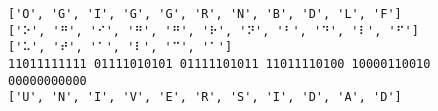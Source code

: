 \documentclass[11pt]{article}
\makeatletter
\newcommand{\boxspacing}{\kern\kvtcb@left@rule\kern\kvtcb@boxsep}
\newcommand{\prompt}[4]{
        \ttfamily\llap{{\color{#2}[#3]:\hspace{3pt}#4}}\vspace{-\baselineskip}
    }
\makeatother
\begin{document}
    \begin{Verbatim}[commandchars=\\\{\}]
['O', 'G', 'I', 'G', 'G', 'R', 'N', 'B', 'D', 'L', 'F']
['⠕', '⠛', '⠊', '⠛', '⠛', '⠗', '⠝', '⠃', '⠙', '⠇', '⠋']
['⠥', '⠞', '⠁', '⠇', '⠉', '⠁']
11011111111 01111010101 01111101011 11011110100 10000110010 00000000000
['U', 'N', 'I', 'V', 'E', 'R', 'S', 'I', 'D', 'A', 'D']
    \end{Verbatim}

    \begin{tcolorbox}[breakable, size=fbox, boxrule=1pt, pad at break*=1mm,colback=cellbackground, colframe=cellborder]
\prompt{In}{incolor}{ }{\boxspacing}
\begin{Verbatim}[commandchars=\\\{\}]

\end{Verbatim}
\end{tcolorbox}


    
    
    
\end{document}
